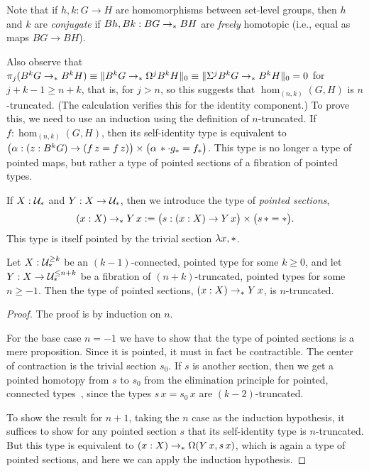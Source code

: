 Note that if $h,k : G \to H$ are homomorphisms between set-level
groups, then $h$ and $k$ are \emph{conjugate} if $Bh, Bk : BG \to_\pt BH$ are
\emph{freely} homotopic (i.e., equal as maps $BG \to BH$).

Also observe that $\pi_j(B^kG \to_\pt B^kH) \equiv
\trunc{0}{B^kG \to_\pt \Omega^jB^kH} \equiv
\trunc{0}{\Sigma^jB^kG \to_\pt B^kH} = 0$ for $j+k-1 \ge n+k$,
that is, for $j>n$, so
this suggests that $\hom_{(n,k)}(G,H)$ is $n$-truncated.
(The calculation verifies this for the identity component.)
To prove
this, we need to use an induction using the definition of
$n$-truncated. If $f:\hom_{(n,k)}(G,H)$, then its self-identity type is
equivalent to $\bigl(\alpha : (z : B^kG) \to (f\,z = f\,z)\bigr) \times
\bigl(\alpha\,\pt \cdot g_\pt = f_\pt\bigr)$. This type is no longer a
type of pointed maps, but rather a type of pointed sections of a
fibration of pointed types.
\begin{defn}
  If $X : \UU_\pt$ and $Y : X \to \UU_\pt$, then we introduce the
  type of \emph{pointed sections},
  \[
    (x : X) \to_\pt Y\,x
    := \bigl(s : (x : X) \to Y\,x\bigr)
    \times \bigl(s\,\pt = \pt\bigr).
  \]
  This type is itself pointed by the trivial section $\lambda x, \pt$.
\end{defn}
\begin{thm}
  Let $X : \UU_\pt^{\ge k}$ be an $(k-1)$-connected, pointed type for
  some $k\ge0$, and
  let $Y : X \to \UU_\pt^{\le n+k}$ be a fibration of
  $(n+k)$-truncated, pointed types for some $n\ge -1$. Then the type
  of pointed sections, $(x : X) \to_\pt Y\,x$, is $n$-truncated.
\end{thm}
\begin{proof}
  The proof is by induction on $n$.

  For the base case $n=-1$ we have to show that the type of pointed
  sections is a mere proposition. Since it is pointed, it must in fact
  be contractible. The center of contraction is the trivial section $s_0$.
  If $s$ is another section, then we get a pointed homotopy from $s$
  to $s_0$ from the elimination principle for pointed, connected
  types~\cite[Lemma~7.5.7]{hottbook}, since the types $s\,x=s_0\,x$ are
  $(k-2)$-truncated.

  To show the result for $n+1$, taking the $n$ case as the induction
  hypothesis, it suffices to show for any pointed section $s$ that its
  self-identity type is $n$-truncated. But this type is equivalent to
  $(x : X) \to_\pt \Omega(Y\,x, s\,x)$, which is again a type of
  pointed sections, and here we can apply the induction hypothesis.
\end{proof}

